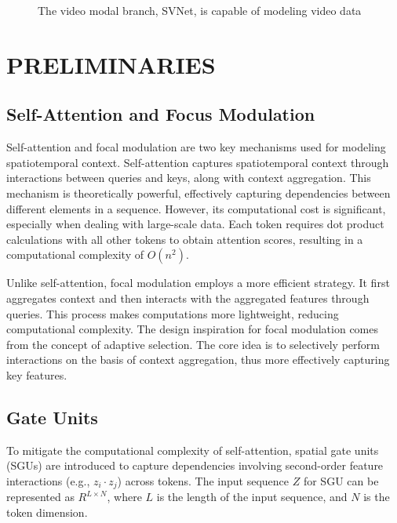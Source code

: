 \documentclass[conference,a4paper,english]{IEEEtran}[2015/08/26]
\begin{document}
\begin{figure}[!b]
  \centering

\caption{The video modal branch, SVNet, is capable of modeling video data}
\label{fig:two_sub_figures_ieee}
\end{figure}
\section{PRELIMINARIES}
\label{sec:relatedwork}
\subsection{Self-Attention and Focus Modulation}

Self-attention and focal modulation are two key mechanisms used for modeling spatiotemporal context. 
Self-attention captures spatiotemporal context through interactions between queries and keys,
along with context aggregation. This mechanism is theoretically powerful, 
effectively capturing dependencies between different elements in a sequence. However, 
its computational cost is significant, especially when dealing with large-scale data. 
Each token requires dot product calculations with all other tokens to obtain attention scores,
resulting in a computational complexity of $O(n^2)$.


Unlike self-attention, focal modulation employs a more efficient strategy. 
It first aggregates context and then interacts with the aggregated features through queries. 
This process makes computations more lightweight, reducing computational complexity. 
The design inspiration for focal modulation comes from the concept of adaptive selection. 
The core idea is to selectively perform interactions on the basis of context aggregation, 
thus more effectively capturing key features.

\subsection{Gate Units}
To mitigate the computational complexity of self-attention, spatial gate units (SGUs) are introduced to capture dependencies involving second-order feature interactions (e.g., $z_i \cdot z_j$) across tokens. The input sequence $Z$ for SGU can be represented as $R^{L \times N}$, where $L$ is the length of the input sequence, and $N$ is the token dimension.
\end{document}
